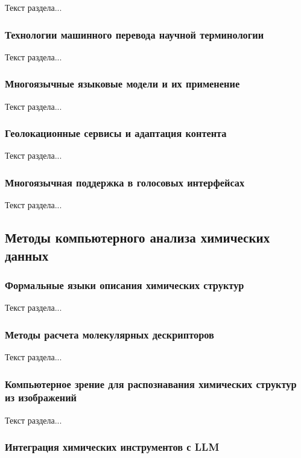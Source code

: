 Текст раздела...

\subsubsection{Технологии машинного перевода научной терминологии}

Текст раздела...

\subsubsection{Многоязычные языковые модели и их применение}

Текст раздела...

\subsubsection{Геолокационные сервисы и адаптация контента}

Текст раздела...

\subsubsection{Многоязычная поддержка в голосовых интерфейсах}

Текст раздела...

\subsection{Методы компьютерного анализа химических данных}

\subsubsection{Формальные языки описания химических структур}

Текст раздела...

\subsubsection{Методы расчета молекулярных дескрипторов}

Текст раздела...

\subsubsection{Компьютерное зрение для распознавания химических структур из изображений}

Текст раздела...

\subsubsection{Интеграция химических инструментов с LLM}


